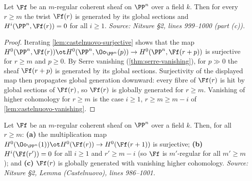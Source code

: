 \begin{lemma}
  \label{lem:castelnuovo-globally-generated}
  Let $\Ff$ be an $m$-regular coherent sheaf on $\PP^n$ over a field $k$. Then
  for every $r\ge m$ the twist $\Ff(r)$ is generated by its global sections and
  $H^i(\PP^n,\Ff(r))=0$ for all $i\ge1$.
  \textit{Source: Nitsure \S2, lines 999--1000 (part (c)).}
\end{lemma}

\begin{proof}
  Iterating \cref{lem:castelnuovo-surjective} shows that the map
  $H^0(\PP^n,\Ff(r))\ot H^0(\PP^n,\Oo_{\PP^n}(p))\to H^0(\PP^n,\Ff(r+p))$ is
  surjective for $r\ge m$ and $p\ge0$. By Serre vanishing
  (\cref{thm:serre-vanishing}), for $p\gg0$ the sheaf $\Ff(r+p)$ is generated by
  its global sections. Surjectivity of the displayed map then propagates global
  generation downward: every fibre of $\Ff(r)$ is hit by global sections of
  $\Ff(r)$, so $\Ff(r)$ is globally generated for $r\ge m$. Vanishing of higher
  cohomology for $r\ge m$ is the case $i\ge1$, $r\ge m\ge m-i$ of
  \cref{lem:castelnuovo-vanishing}.
\end{proof}

\begin{lemma}
  \label{lem:castelnuovo}
  Let $\Ff$ be an $m$-regular coherent sheaf on $\PP^n$ over a field $k$. Then,
  for all $r\ge m$:
  \textbf{(a)} the multiplication map
  $H^0(\Oo_{\PP^n}(1))\ot H^0(\Ff(r))\to H^0(\Ff(r+1))$ is surjective;
  \textbf{(b)} $H^i(\Ff(r'))=0$ for all $i\ge1$ and $r'\ge m-i$ (so $\Ff$ is
  $m'$-regular for all $m'\ge m$); and
  \textbf{(c)} $\Ff(r)$ is globally generated with vanishing higher cohomology.
  \textit{Source: Nitsure \S2, Lemma (Castelnuovo), lines 986--1001.}
\end{lemma}

